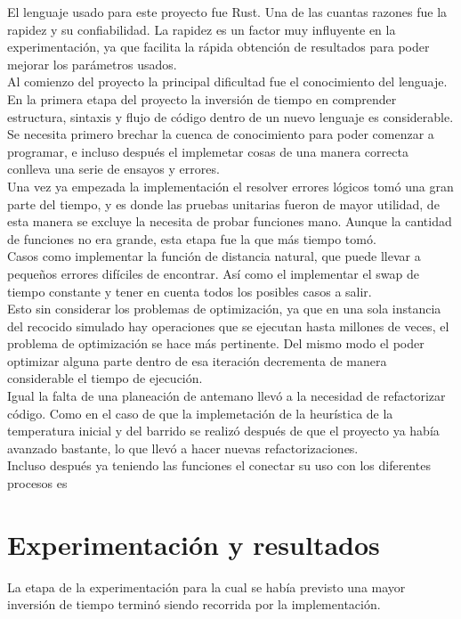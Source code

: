\documentclass[a4paper]{article}
\begin{document}
El lenguaje usado para este proyecto fue Rust. Una de las cuantas razones fue la rapidez y su confiabilidad. La rapidez es un factor muy influyente en la experimentaci\'on, ya que facilita la r\'apida obtenci\'on de resultados para poder mejorar los par\'ametros usados.\\

Al comienzo del proyecto la principal dificultad fue el conocimiento del lenguaje. En la primera etapa del proyecto la inversi\'on de tiempo en comprender estructura, sintaxis y flujo de c\'odigo dentro de un nuevo lenguaje es considerable. Se necesita primero brechar la cuenca de conocimiento para poder comenzar a programar, e incluso despu\'es el implemetar cosas de una manera correcta conlleva una serie de ensayos y errores. \\

Una vez ya empezada la implementaci\'on el resolver errores l\'ogicos tom\'o una gran parte del tiempo, y es donde las pruebas unitarias fueron de mayor utilidad, de esta manera se excluye la necesita de probar funciones  mano. Aunque la cantidad de funciones no era grande, esta etapa fue la que m\'as tiempo tom\'o.\\

Casos como implementar la funci\'on de distancia natural, que puede llevar a pequeños errores difíciles de encontrar. Así como el implementar el swap de tiempo constante y tener en cuenta todos los posibles casos a salir.\\

Esto sin considerar los problemas de optimizaci\'on, ya que en una sola instancia del recocido simulado hay operaciones que se ejecutan hasta millones de veces, el problema de optimizaci\'on se hace m\'as pertinente. Del mismo modo el poder optimizar alguna parte dentro de esa iteraci\'on decrementa de manera considerable el tiempo de ejecuci\'on.\\

Igual la falta  de una planeaci\'on de antemano llev\'o a la necesidad de refactorizar c\'odigo. Como en el caso de que la implemetaci\'on de la heur\'istica de la temperatura inicial y del barrido se realiz\'o despu\'es de que el proyecto ya hab\'ia avanzado bastante, lo que llev\'o a hacer nuevas refactorizaciones.\\

Incluso despu\'es ya teniendo las funciones el conectar su uso con los diferentes procesos es


\section*{Experimentaci\'on y resultados}
La etapa de la experimentaci\'on para la cual se hab\'ia previsto una mayor inversi\'on de tiempo termin\'o siendo recorrida por la implementaci\'on.\\
\end{document}

